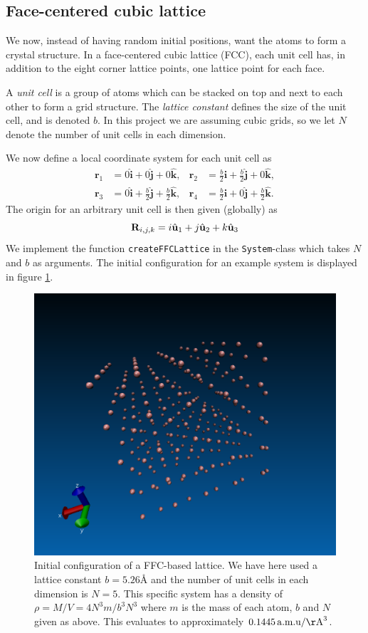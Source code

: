 \documentclass[a4paper]{article}
\renewcommand{\vec}[1]{\mathbf{#1}}
\begin{document}
\subsection{Face-centered cubic lattice}
\label{sub:face_centered_cubic_lattice}

    We now, instead of having random initial positions, want the atoms to form
    a crystal structure. In a face-centered cubic lattice (FCC), each unit cell
    has, in addition to the eight corner lattice points, one lattice point for
    each face.

    A \emph{unit cell} is a group of atoms which can be stacked on top and next
    to each other to form a grid structure. The \emph{lattice constant} defines
    the size of the unit cell, and is denoted $b$. In this project we are
    assuming cubic grids, so we let $N$ denote the number of unit cells in each
    dimension.
    
    We now define a local coordinate system for each unit cell as
    \begin{align*}
        \vec{r}_1 &= 0\hat{\vec{i}} + 0\hat{\vec{j}} + 0\hat{\vec{k}}, &
        \vec{r}_2 &= \frac{b}{2}\hat{\vec{i}} + \frac{b}{2}\hat{\vec{j}} +
        0\hat{\vec{k}},\\ \vec{r}_3 &= 0\hat{\vec{i}} +
        \frac{b}{2}\hat{\vec{j}} + \frac{b}{2}\hat{\vec{k}}, & \vec{r}_4 &=
        \frac{b}{2}\hat{\vec{i}} + 0\hat{\vec{j}} + \frac{b}{2}\hat{\vec{k}}.
    \end{align*}
    The origin for an arbitrary unit cell is then given (globally) as
    \begin{equation}
        \notag \vec{R}_{i, j, k} = i\hat{\vec{u}}_1 + j\hat{\vec{u}}_2 +
        k\hat{\vec{u}}_3
    \end{equation}
    We implement the function \texttt{createFFCLattice} in the
    \texttt{System}-class which takes $N$ and $b$ as arguments. The initial
    configuration for an example system is displayed in figure
    \ref{fig:ffc_iteration}.
    \begin{figure}
        \centering \includegraphics[width=0.4\linewidth]{ffc_iteration}
        \caption[Crystallic structure in argon]{Initial configuration of a
            FFC-based lattice. We have here used a lattice constant $b =
            5.26${\AA} and the number of unit cells in each dimension is $N =
            5$. This specific system has a density of $\rho = M / V = 4N^3m /
            b^3N^3$ where $m$ is the mass of each atom, $b$ and $N$ given as
            above. This evaluates to approximately $0.1445 \,\mathrm{a.m.u} /
        \mathrm{\AA}^3$.}
        \label{fig:ffc_iteration}
    \end{figure}
    
\end{document}
